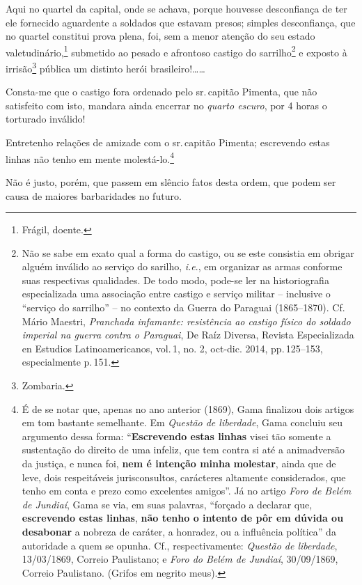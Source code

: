 Aqui no quartel da capital, onde se achava, porque houvesse desconfiança
de ter ele fornecido aguardente a soldados que estavam presos; simples
desconfiança, que no quartel constitui prova plena, foi, sem a menor
atenção do seu estado valetudinário,\footnote{ Frágil, doente.}
submetido ao pesado e afrontoso castigo do sarrilho\footnote{ Não se
  sabe em exato qual a forma do castigo, ou se este consistia em obrigar
  alguém inválido ao serviço do sarilho, \emph{i.e}., em organizar as
  armas conforme suas respectivas qualidades. De todo modo, pode-se ler
  na historiografia especializada uma associação entre castigo e serviço
  militar -- inclusive o ``serviço do sarrilho'' -- no contexto da
  Guerra do Paraguai (1865--1870). Cf. Mário Maestri, \emph{Pranchada
  infamante: resistência ao castigo físico do soldado imperial na guerra
  contra o Paraguai}, De Raíz Diversa, Revista Especializada en Estudios
  Latinoamericanos, vol.\,1, no. 2, oct-dic. 2014, pp.\,125--153,
  especialmente p.\,151.} e exposto à irrisão\footnote{ Zombaria.}
pública um distinto herói brasileiro!\ldots\ldots{}

Consta-me que o castigo fora ordenado pelo sr.\,capitão Pimenta, que não
satisfeito com isto, mandara ainda encerrar no \emph{quarto escuro}, por
4 horas o torturado inválido!

Entretenho relações de amizade com o sr.\,capitão Pimenta; escrevendo
estas linhas não tenho em mente molestá-lo.\footnote{ É de se notar
  que, apenas no ano anterior (1869), Gama finalizou dois artigos em tom
  bastante semelhante. Em \emph{Questão de liberdade}, Gama concluiu seu
  argumento dessa forma: ``\textbf{Escrevendo estas linhas} visei tão
  somente a sustentação do direito de uma infeliz, que tem contra si até
  a animadversão da justiça, e nunca foi, \textbf{nem
  é intenção minha} \textbf{molestar}, ainda que de leve, dois
  respeitáveis jurisconsultos, carácteres altamente considerados, que
  tenho em conta e prezo como excelentes amigos''. Já no artigo
  \emph{Foro de Belém de Jundiaí}, Gama se via, em suas palavras,
  ``forçado a declarar que, \textbf{escrevendo estas linhas},
  \textbf{não tenho o intento de pôr em dúvida ou desabonar} a nobreza
  de caráter, a honradez, ou a influência política'' da autoridade a
  quem se opunha. Cf., respectivamente: \emph{Questão de liberdade},
  13/03/1869, Correio Paulistano; e \emph{Foro do Belém de Jundiaí},
  30/09/1869, Correio Paulistano. (Grifos em negrito meus).}

Não é justo, porém, que passem em slêncio fatos desta ordem, que podem
ser causa de maiores barbaridades no futuro.

